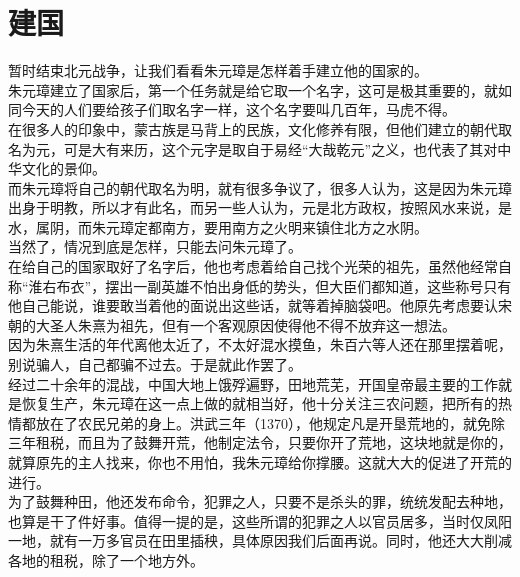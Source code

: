 \section{建国}
\ifnum{}
	\begin{multicols}{\theparacolNo}
\fi
暂时结束北元战争，让我们看看朱元璋是怎样着手建立他的国家的。\\

朱元璋建立了国家后，第一个任务就是给它取一个名字，这可是极其重要的，就如同今天的人们要给孩子们取名字一样，这个名字要叫几百年，马虎不得。\\

在很多人的印象中，蒙古族是马背上的民族，文化修养有限，但他们建立的朝代取名为元，可是大有来历，这个元字是取自于易经“大哉乾元”之义，也代表了其对中华文化的景仰。\\

而朱元璋将自己的朝代取名为明，就有很多争议了，很多人认为，这是因为朱元璋出身于明教，所以才有此名，而另一些人认为，元是北方政权，按照风水来说，是水，属阴，而朱元璋定都南方，要用南方之火明来镇住北方之水阴。\\

当然了，情况到底是怎样，只能去问朱元璋了。\\

在给自己的国家取好了名字后，他也考虑着给自己找个光荣的祖先，虽然他经常自称“淮右布衣”，摆出一副英雄不怕出身低的势头，但大臣们都知道，这些称号只有他自己能说，谁要敢当着他的面说出这些话，就等着掉脑袋吧。他原先考虑要认宋朝的大圣人朱熹为祖先，但有一个客观原因使得他不得不放弃这一想法。\\

因为朱熹生活的年代离他太近了，不太好混水摸鱼，朱百六等人还在那里摆着呢，别说骗人，自己都骗不过去。于是就此作罢了。\\

经过二十余年的混战，中国大地上饿殍遍野，田地荒芜，开国皇帝最主要的工作就是恢复生产，朱元璋在这一点上做的就相当好，他十分关注三农问题，把所有的热情都放在了农民兄弟的身上。洪武三年（1370），他规定凡是开垦荒地的，就免除三年租税，而且为了鼓舞开荒，他制定法令，只要你开了荒地，这块地就是你的，就算原先的主人找来，你也不用怕，我朱元璋给你撑腰。这就大大的促进了开荒的进行。\\

为了鼓舞种田，他还发布命令，犯罪之人，只要不是杀头的罪，统统发配去种地，也算是干了件好事。值得一提的是，这些所谓的犯罪之人以官员居多，当时仅凤阳一地，就有一万多官员在田里插秧，具体原因我们后面再说。同时，他还大大削减各地的租税，除了一个地方外。\\


\end{multicols}
